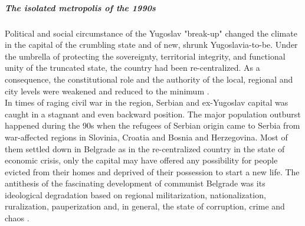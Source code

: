 \documentclass[11pt]{report}
\begin{document}
\subparagraph{The isolated metropolis of the 1990s}
Political and social circumstance of the Yugoslav "break-up" changed the climate in the capital of the crumbling state and of new, shrunk Yugoslavia-to-be.  Under the umbrella of protecting the sovereignty, territorial integrity,  and functional unity of the truncated state, the country had been re-centralized. As a consequence, the constitutional role and the authority of the local, regional and city levels were weakened and reduced to the minimum \cite{Vujosevic 2015 Regionalizam u Srbiji 2}. 
\\
In times of raging civil war in the region, Serbian and ex-Yugoslav capital was caught in a stagnant and even backward position.
The major population outburst happened during the 90s when the refugees of Serbian origin came to Serbia from war-affected regions in Slovinia, Croatia and Bosnia and Herzegovina. Most of them settled down in Belgrade as in the re-centralized country in the state of economic crisis, only the capital may have offered any possibility for people evicted from their homes and deprived of their possession to start a new life.
The antithesis of the fascinating development of communist Belgrade was its ideological  degradation  based  on regional militarization, nationalization, ruralization, pauperization and, in general, the state of corruption, crime and chaos \cite{ref}. 
\end{document}
